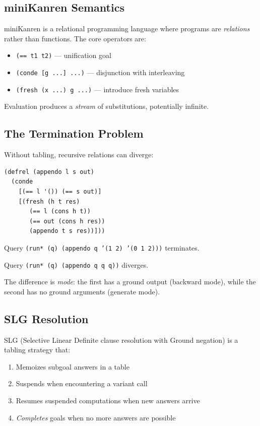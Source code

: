 \documentclass[11pt,a4paper]{article}
\begin{document}
\subsection{miniKanren Semantics}
\label{subsec:mk_chirho}

miniKanren is a relational programming language where programs are
\emph{relations} rather than functions. The core operators are:

\begin{itemize}
  \item \texttt{(== t1 t2)} --- unification goal
  \item \texttt{(conde [g ...] ...)} --- disjunction with interleaving
  \item \texttt{(fresh (x ...) g ...)} --- introduce fresh variables
\end{itemize}

Evaluation produces a \emph{stream} of substitutions, potentially infinite.

\subsection{The Termination Problem}
\label{subsec:termination_chirho}

Without tabling, recursive relations can diverge:

\begin{lstlisting}[caption={The appendo relation}]
(defrel (appendo l s out)
  (conde
    [(== l '()) (== s out)]
    [(fresh (h t res)
       (== l (cons h t))
       (== out (cons h res))
       (appendo t s res))]))
\end{lstlisting}

Query \texttt{(run* (q) (appendo q '(1 2) '(0 1 2)))} terminates.

Query \texttt{(run* (q) (appendo q q q))} diverges.

The difference is \emph{mode}: the first has a ground output (backward mode),
while the second has no ground arguments (generate mode).

\subsection{SLG Resolution}
\label{subsec:slg_chirho}

SLG (Selective Linear Definite clause resolution with Ground negation) is a
tabling strategy that:

\begin{enumerate}
  \item Memoizes subgoal answers in a table
  \item Suspends when encountering a variant call
  \item Resumes suspended computations when new answers arrive
  \item \emph{Completes} goals when no more answers are possible
\end{enumerate}
\end{document}
